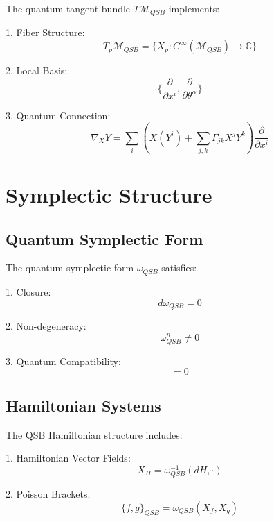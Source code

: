 \documentclass[12pt]{article}
\begin{document}
The quantum tangent bundle $T\mathcal{M}_{QSB}$ implements:

1. Fiber Structure:
\begin{equation}
T_p\mathcal{M}_{QSB} = \{X_p : C^\infty(\mathcal{M}_{QSB}) \rightarrow \mathbb{C}\}
\end{equation}

2. Local Basis:
\begin{equation}
\{\frac{\partial}{\partial x^i}, \frac{\partial}{\partial θ^\alpha}\}
\end{equation}

3. Quantum Connection:
\begin{equation}
\nabla_X Y = \sum_i (X(Y^i) + \sum_{j,k} Γ^i_{jk}X^jY^k)\frac{\partial}{\partial x^i}
\end{equation}

\section{Symplectic Structure}

\subsection{Quantum Symplectic Form}

The quantum symplectic form $ω_{QSB}$ satisfies:

1. Closure:
\begin{equation}
dω_{QSB} = 0
\end{equation}

2. Non-degeneracy:
\begin{equation}
ω_{QSB}^n \neq 0
\end{equation}

3. Quantum Compatibility:
\begin{equation}
[ω_{QSB}, H_{QSB}] = 0
\end{equation}

\subsection{Hamiltonian Systems}

The QSB Hamiltonian structure includes:

1. Hamiltonian Vector Fields:
\begin{equation}
X_H = ω_{QSB}^{-1}(dH, \cdot)
\end{equation}

2. Poisson Brackets:
\begin{equation}
\{f,g\}_{QSB} = ω_{QSB}(X_f, X_g)
\end{equation}
\end{document}
